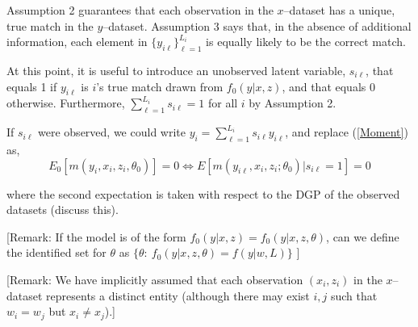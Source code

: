 \documentclass[12pt]{article}
\newcommand{\sumL}{\sum_{\ell=1}^{L_i}}
\newcommand{\yiL}{\{y_{i\ell}\}_{\ell=1}^{L_i}}
\begin{document}
Assumption 2 guarantees that each observation in the $x$--dataset has a unique, true match  in the $y$--dataset.  Assumption 3 says that, in the absence of
additional information, each element in $\yiL$  is equally
likely to be the correct match. 

At this point, it is useful to introduce an unobserved latent variable, $s_{i\ell}$, that equals 1 if $y_{i\ell}$ is $i$'s true match drawn from $f_0(y|x,z)$, and that equals 0 otherwise. Furthermore, $\sumL s_{i\ell}=1$ for all $i$ by Assumption 2.    

If $s_{i\ell}$ were observed,  we could write $y_i = \sum_{\ell=1}^{L_i} s_{i\ell} y_{i\ell}$, and replace (\ref{Moment}) as,
\begin{equation} E_0\left[m(y_i, x_i, z_i, \theta_0 )\right] = 0 \iff %
E\left[m(y_{i\ell},x_i,z_i; \theta_0) | s_{i\ell} =1 \right] = 0  \label{truemodel} \end{equation} 

where the second expectation is taken with respect to the DGP of the observed datasets (discuss this). 

[Remark: If the model is of the form $f_0(y | x,z) = f_0(y | x,z,\theta)$, can we define the identified set for $\theta$ as $\{ \theta:\ f_0(y | x, z, \theta) = f(y | w, L)\}$ ]
 


[Remark: We have implicitly assumed that each observation $(x_i, z_i)$ in the $x$--dataset represents a distinct entity (although there may exist $i, j$ such that $w_i=w_j$ but $x_i \neq x_j$).]
\end{document}
